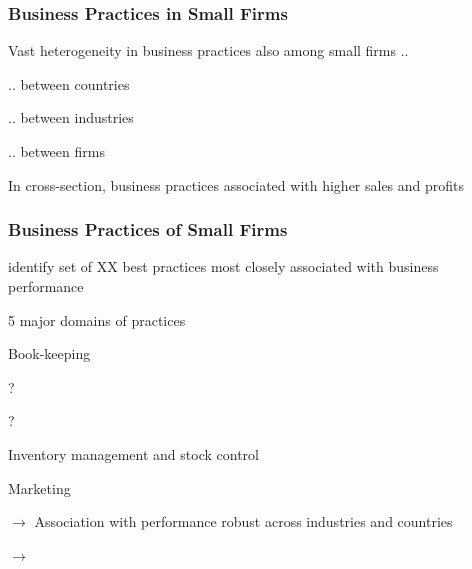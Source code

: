 \documentclass[hideothersubsections, usenames,dvipsnames,11pt]{beamer}
\newenvironment{itemize_2pt}{\itemize\addtolength{\itemsep}{2pt}}{\enditemize}
\newenvironment{enumerate_2pt}{\enumerate\addtolength{\itemsep}{2pt}}{\endenumerate}
\begin{document}
\begin{frame}
\frametitle{Business Practices in Small Firms}

	Vast heterogeneity in business practices \textcolor{bdf}{also among small firms} \citep{McKenzie2009, McKenzie2017}..
	\begin{itemize_2pt}
		\item .. between countries
		\item .. between industries
		\item .. between firms
	\end{itemize_2pt}
	
	\vspace{0.5em}
	
	In cross-section, business practices \textcolor{bdf}{associated with higher sales and profits} \citep{McKenzie2017}
	
\end{frame}

\begin{frame}
\frametitle{Business Practices of Small Firms}

	\citet{McKenzie2017} identify \textcolor{bdf}{set of XX best practices} most closely associated with business performance
	\begin{itemize_2pt}
		\item 5 major domains of practices
		\begin{enumerate_2pt}
			\item Book-keeping
			\item ?
			\item ?
			\item Inventory management and stock control
			\item Marketing
		\end{enumerate_2pt}
	\item[] $\rightarrow$ Association with performance robust across industries and countries
	\item[] $\rightarrow$
	\end{itemize_2pt}
\end{frame}

\end{document}
